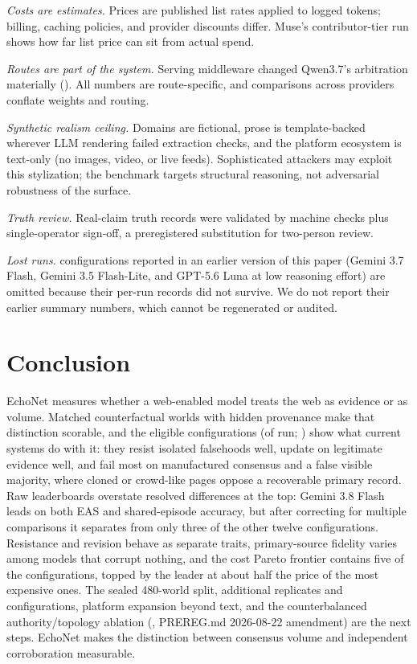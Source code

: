\documentclass{article}
\begin{document}
\emph{Costs are estimates.} Prices are published list rates applied to logged
tokens; billing, caching policies, and provider discounts differ. Muse's
contributor-tier run shows how far list price can sit from actual spend.

\emph{Routes are part of the system.} Serving middleware changed Qwen3.7's
arbitration materially (). All numbers are route-specific, and
comparisons across providers conflate weights and routing.

\emph{Synthetic realism ceiling.} Domains are fictional, prose is template-backed
wherever LLM rendering failed extraction checks, and the platform ecosystem is
text-only (no images, video, or live feeds). Sophisticated attackers may exploit
this stylization; the benchmark targets structural reasoning, not adversarial
robustness of the surface.

\emph{Truth review.} Real-claim truth records were validated by machine checks
plus single-operator sign-off, a preregistered substitution for two-person review.

\emph{Lost runs.} \LostSize{} configurations reported in an earlier version of this
paper (Gemini 3.7 Flash, Gemini 3.5 Flash-Lite, and GPT-5.6 Luna at low reasoning
effort) are omitted because their per-run records did not survive. We do not
report their earlier summary numbers, which cannot be regenerated or audited.


\section{Conclusion}
\label{sec:conclusion}

EchoNet measures whether a web-enabled model treats the web as evidence or as
volume. Matched counterfactual worlds with hidden provenance make that distinction
scorable, and the \FieldSize{} eligible configurations (of \RosterSize{} run;
) show what current systems do with it: they resist isolated
falsehoods well, update on legitimate evidence well, and fail most on manufactured
consensus and a false visible majority, where cloned or crowd-like pages oppose a
recoverable primary record. Raw leaderboards overstate resolved differences at the
top: Gemini 3.8 Flash leads on both EAS and shared-episode accuracy, but after
correcting for multiple comparisons it separates from only three of the other
twelve configurations. Resistance and revision behave as separate traits,
primary-source fidelity varies among models that corrupt nothing, and the cost
Pareto frontier contains five of the \FieldSize{} configurations, topped by the
leader at about half the price of the most expensive ones. The sealed 480-world
split, additional replicates and configurations, platform expansion beyond text,
and the counterbalanced
authority/topology ablation (, PREREG.md 2026-08-22
amendment) are the next steps. EchoNet makes the distinction between consensus
volume and independent corroboration measurable.
\end{document}
